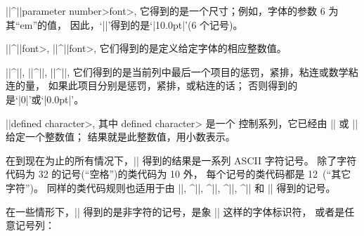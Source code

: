 {{{{{{{{%
\smallbreak
\textindent\bull |\the|^|\fontdimen|\<parameter number>\<font>,
它得到的是一个尺寸；例如，字体的参数 6 为其``em''的值，
因此，`|\the{}\tenrm|'得到的是`|10.0pt|'(6 个记号)。

\smallbreak
\textindent\bull |\the|^|\hyphenchar|\<font>, |\the|^|\skewchar|\<font>,
它们得到的是定义给定字体的相应整数值。

\smallbreak
\textindent\bull |\the|^|\lastpenalty|, |\the|^|\lastkern|, |\the|^|\lastskip|,
它们得到的是当前列中最后一个项目的惩罚，紧排，粘连或数学粘连的量，
如果此项目分别是惩罚，紧排，或粘连的话；
否则得到的是`|0|'或`|0.0pt|'。

\smallbreak
\textindent\bull |\the|\<defined character>, 其中 \<defined character> 是一个%
控制系列，它已经由 |\chardef| 或 |\mathchardef| 给定一个整数值；
结果就是此整数值，用小数表示。

\ddanger 在到现在为止的所有情况下，|\the| 得到的结果是一系列 ASCII 字符记号。%
除了字符代码为 32 的记号(``空格'')的类代码为 10 外，
每个记号的类代码都是 12~(``其它字符'')。%
同样的类代码规则也适用于由 |\number|, ^|\romannumeral|, ^|\string|, ^|\meaning|,
^|\jobname| 和 |\fontname| 得到的记号。

\ddanger 在一些情形下，|\the| 得到的是非字符的记号，是象 |\tenrm| 这样的字体标识符，
或者是任意记号列：

}}}}}}}}
